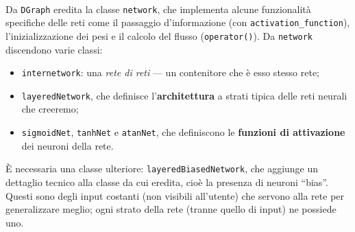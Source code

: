 \documentclass{article}
\begin{document}
\begin{center}
\end{center}

\paragraph{} Da \texttt{DGraph} eredita la classe \texttt{network}, che implementa alcune funzionalità specifiche delle reti come il passaggio d'informazione (con \texttt{activation\_function}), l'inizializzazione dei pesi e il calcolo del flusso (\texttt{operator()}). Da \texttt{network} discendono varie classi:
\begin{itemize}
	\item \texttt{internetwork}: una \emph{rete di reti} --- un contenitore che è esso stesso rete;
	\item \texttt{layeredNetwork}, che definisce l'\textbf{architettura} a strati tipica delle reti neurali che creeremo;
	\item \texttt{sigmoidNet}, \texttt{tanhNet} e \texttt{atanNet}, che definiscono le \textbf{funzioni di attivazione} dei neuroni della rete.
\end{itemize}
È necessaria una classe ulteriore: \texttt{layeredBiasedNetwork}, che aggiunge un dettaglio tecnico alla classe da cui eredita, cioè la presenza di neuroni “bias”. Questi sono degli input costanti (non visibili all'utente) che servono alla rete per generalizzare meglio; ogni strato della rete (tranne quello di input) ne possiede uno.
\end{document}
